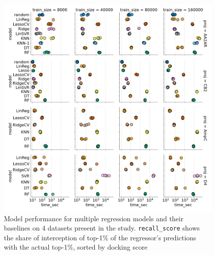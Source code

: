 \begin{figure}[ht]
\centering
\includegraphics[width=1.0\textwidth]{figures/figure_3_single-shot-performance.png}
\caption{Model performance for multiple regression models and their baselines on 4 datasets present in the study. \texttt{recall\_score} shows the share of interception of top-1\% of the regressor's predictions with the actual top-1\%, sorted by docking score}
\label{fig:fig_3_singleshot}
\end{figure}


